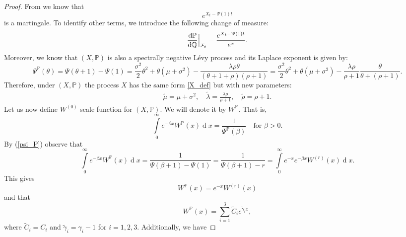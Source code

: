 \documentclass[10pt]{amsart}
\def\P{{\mathbb{P}}}
\def\Q{{\mathbb{Q}}}
\def \F{{\mathcal{F}}}
\newcommand{\dx}{\operatorname{d}\!}
\def\P{{\mathbb P}} \def\le{\left} \def\ri{\right} \def\i{\infty}
\begin{document}
\begin{proof}
			From \cite{kyprianou2} we know that
			\begin{equation*}
				e^{X_t - \Psi(1)t}
			\end{equation*}
			is a martingale. To identify other terms, we introduce the following change of measure:
			\begin{equation*}
				\frac{\dx \mathbb{P}}{\dx \Q} \Big{|} _{\F_t} = \frac{e^{X_t - \Psi(1)t}}{e^x}.
			\end{equation*}
			Moreover, we know that $(X, \mathbb{P})$ is also a spectrally negative L\'evy process and its Laplace exponent is given by:
			\begin{equation}\label{psi_P}
				\Psi^\mathbb{P}(\theta) = \Psi(\theta+1) - \Psi(1)=\frac{\sigma^2}{2}\theta^2 + \theta(\mu + \sigma^2) - \frac{\lambda\rho\theta}{(\theta+1+\rho)(\rho+1)} = \frac{\sigma^2}{2}\theta^2 + \theta(\mu + \sigma^2) - \frac{\lambda\rho}{\rho+1}\frac{\theta}{\theta+(\rho+1)}.
			\end{equation}
			Therefore, under $(X,\P)$ the process $X$ has the same form \eqref{X_def} but with new parameters:
			\begin{align*}
				\tilde{\mu} = \mu + \sigma^2,\quad
				\tilde{\lambda} = \frac{\lambda\rho}{\rho+1},\quad
				\tilde{\rho} = \rho +1.
			\end{align*}
			Let us now define $W^{(0)}$ scale function for $(X, \mathbb{P})$. We will denote it by $W^\mathbb{P}$. That is,
			\begin{equation*}
				\int\limits_0^\infty e^{-\beta x}W^{\mathbb{P}}(x)\dx x = \frac{1}{\Psi^{\mathbb{P}}(\beta)} \quad \text{for $\beta>0$}.
			\end{equation*}
			By (\ref{psi_P}) observe that
			\begin{equation*}
				\int\limits_0^\infty e^{-\beta x}W^{\mathbb{P}}(x)\dx x = \frac{1}{\Psi(\beta + 1) - \Psi(1)} =  \frac{1}{\Psi(\beta + 1) - r} = \int\limits_0^\infty e^{-x}e^{-\beta x}W^{(r)}(x)\dx x.
			\end{equation*}
			This gives
			\begin{equation*}
				W^{\mathbb{P}}(x) = e^{-x}W^{(r)}(x)
			\end{equation*}
			and that
			\begin{equation}\label{W_P}
				W^{\P}(x) = \sum_{i=1}^3 \tilde{C}_i e^{\tilde{\gamma}_i x},
			\end{equation}
			where $\tilde{C}_i = C_i$ and $\tilde{\gamma}_i = \gamma_i - 1$ for $i=1,2,3$.
			Additionally, we have

\end{proof}
\end{document}
